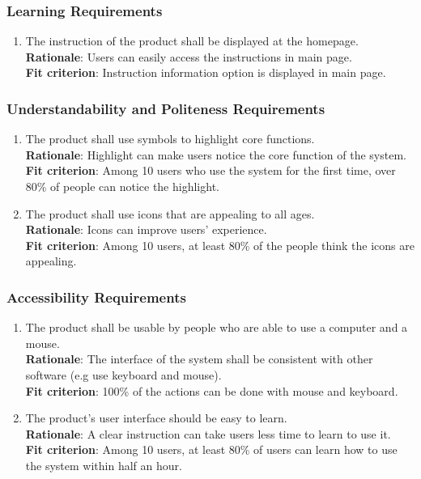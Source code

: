 \documentclass{article}
\begin{document}
\subsubsection{Learning Requirements}
\begin{enumerate}[UH3.1]
    \item The instruction of the product shall be displayed at the homepage.\\
    \textbf{Rationale}: Users can easily access the instructions in main page.\\
    \textbf{Fit criterion}: Instruction information option is displayed in main page.
\end{enumerate}
\subsubsection{Understandability and Politeness Requirements}
\begin{enumerate}[UH4.1]
    \item The product shall use symbols to highlight core functions.\\
    \textbf{Rationale}: Highlight can make users notice the core function of the system.\\
    \textbf{Fit criterion}: Among 10 users who use the system for the first time, over 80\% of people can notice the highlight.
    
    \item The product shall use icons that are appealing to all ages.\\
    \textbf{Rationale}: Icons can improve users' experience.\\
    \textbf{Fit criterion}: Among 10 users, at least 80\% of the people think the icons are appealing.
\end{enumerate}
\subsubsection{Accessibility Requirements}
\begin{enumerate}[UH5.1]
    \item The product shall be usable by people who are able to use a computer and a mouse.\\
    \textbf{Rationale}: The interface of the system shall be consistent with other software (e.g use keyboard and mouse).\\
    \textbf{Fit criterion}: 100\% of the actions can be done with mouse and keyboard.
    
    \item The product's user interface should be easy to learn.\\
    \textbf{Rationale}: A clear instruction can take users less time to learn to use it.\\
    \textbf{Fit criterion}: Among 10 users, at least 80\% of users can learn how to use the system within half an hour.
\end{enumerate}
\end{document}
